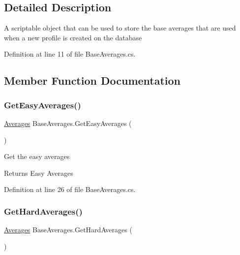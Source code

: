 \subsection{Detailed Description}
A scriptable object that can be used to store the base averages that are used when a new profile is created on the database 



Definition at line 11 of file Base\+Averages.\+cs.



\subsection{Member Function Documentation}
\mbox{\label{class_base_averages_af137b781aca1054548d1a04cdb7b2d16}} 
\subsubsection{\texorpdfstring{Get\+Easy\+Averages()}{GetEasyAverages()}}
{\footnotesize\ttfamily \mbox{\hyperlink{struct_level_generation_1_1_averages}{Averages}} Base\+Averages.\+Get\+Easy\+Averages (\begin{DoxyParamCaption}{ }\end{DoxyParamCaption})}



Get the easy averages 

\begin{DoxyReturn}{Returns}
Easy Averages
\end{DoxyReturn}


Definition at line 26 of file Base\+Averages.\+cs.

\mbox{\label{class_base_averages_a5f0bafc5282ea7b0c4842efbe5d077af}} 
\subsubsection{\texorpdfstring{Get\+Hard\+Averages()}{GetHardAverages()}}
{\footnotesize\ttfamily \mbox{\hyperlink{struct_level_generation_1_1_averages}{Averages}} Base\+Averages.\+Get\+Hard\+Averages (\begin{DoxyParamCaption}{ }\end{DoxyParamCaption})}



